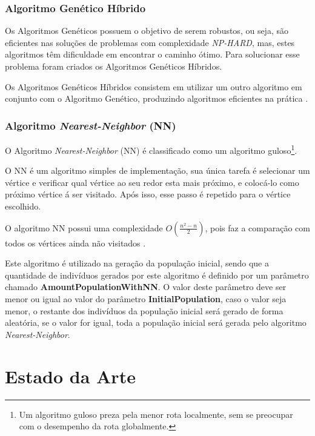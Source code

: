 \documentclass[12pt,openright,a4paper,twoside]{tcc}
\begin{document}
		\subsection{Algoritmo Genético Híbrido}

			Os Algoritmos Genéticos possuem o objetivo de serem robustos, ou seja, são eficientes nas soluções de problemas com complexidade \textit{NP-HARD}, mas, estes algoritmos têm dificuldade em encontrar o caminho ótimo. Para solucionar esse problema foram criados os Algoritmos Genéticos Híbridos.

			Os Algoritmos Genéticos Híbridos consistem em utilizar um outro algoritmo em conjunto com o Algoritmo Genético, produzindo algoritmos eficientes na prática \cite{TravelingTheory}.

        \subsection{Algoritmo \textit{Nearest-Neighbor} (NN)}

            O Algoritmo \textit{Nearest-Neighbor} (NN) é classificado como um algoritmo guloso\footnote{Um algoritmo guloso preza pela menor rota localmente, sem se preocupar com o desempenho da rota globalmente.}.

            O NN é um algoritmo simples de implementação, sua única tarefa é selecionar um vértice e verificar qual vértice ao seu redor esta mais próximo, e colocá-lo como próximo vértice á ser visitado. Após isso, esse passo é repetido para o vértice escolhido. 

            O algoritmo NN possui uma complexidade $O(\frac{n^2-n}{2})$, pois faz a comparação com todos os vértices ainda não visitados \cite{NN}.

            Este algoritmo é utilizado na geração da população inicial, sendo que a quantidade de indivíduos gerados por este algoritmo é definido por um parâmetro chamado \textbf{AmountPopulationWithNN}. O valor deste parâmetro deve ser menor ou igual ao valor do parâmetro \textbf{InitialPopulation}, caso o valor seja menor, o restante dos indivíduos da população inicial será gerado de forma aleatória, se o valor for igual, toda a população inicial será gerada pelo algoritmo \textit{Nearest-Neighbor}.  
			
		\chapter{Estado da Arte}
		
\end{document}
